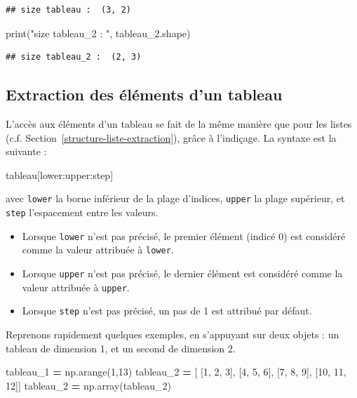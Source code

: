 \documentclass[12pt,]{book}
\newenvironment{Shaded}{\begin{snugshade}}{\end{snugshade}}
\newcommand{\DecValTok}[1]{\textcolor[rgb]{0.00,0.00,0.81}{#1}}
\newcommand{\StringTok}[1]{\textcolor[rgb]{0.31,0.60,0.02}{#1}}
\newcommand{\OperatorTok}[1]{\textcolor[rgb]{0.81,0.36,0.00}{\textbf{#1}}}
\newcommand{\BuiltInTok}[1]{#1}
\newcommand{\NormalTok}[1]{#1}
\providecommand{\tightlist}{%
  \setlength{\itemsep}{0pt}\setlength{\parskip}{0pt}}
\numberwithin{equation}{section}
\numberwithin{countremarque}{section}
\begin{document}
\begin{lstlisting}
## size tableau :  (3, 2)
\end{lstlisting}

\begin{Shaded}
\begin{Highlighting}[]
\BuiltInTok{print}\NormalTok{(}\StringTok{"size tableau_2 : "}\NormalTok{, tableau_2.shape)}
\end{Highlighting}
\end{Shaded}

\begin{lstlisting}
## size tableau_2 :  (2, 3)
\end{lstlisting}

\subsection{Extraction des éléments d'un
tableau}\label{extraction-des-elements-dun-tableau}

L'accès aux éléments d'un tableau se fait de la même manière que pour
les listes (c.f. Section~\ref{structure-liste-extraction}), grâce à
l'indiçage. La syntaxe est la suivante :

\begin{Shaded}
\begin{Highlighting}[]
\NormalTok{tableau[lower:upper:step]}
\end{Highlighting}
\end{Shaded}

avec \texttt{lower} la borne inférieur de la plage d'indices,
\texttt{upper} la plage supérieur, et \texttt{step} l'espacement entre
les valeurs.

\begin{itemize}
\tightlist
\item
  Lorsque \texttt{lower} n'est pas précisé, le premier élément (indicé
  0) est considéré comme la valeur attribuée à \texttt{lower}.
\item
  Lorsque \texttt{upper} n'est pas précisé, le dernier élément est
  considéré comme la valeur attribuée à \texttt{upper}.
\item
  Lorsque \texttt{step} n'est pas précisé, un pas de 1 est attribué par
  défaut.
\end{itemize}

Reprenons rapidement quelques exemples, en s'appuyant sur deux objets :
un tableau de dimension 1, et un second de dimension 2.

\begin{Shaded}
\begin{Highlighting}[]
\NormalTok{tableau_1 }\OperatorTok{=}\NormalTok{ np.arange(}\DecValTok{1}\NormalTok{,}\DecValTok{13}\NormalTok{)}
\NormalTok{tableau_2 }\OperatorTok{=}\NormalTok{ [ [}\DecValTok{1}\NormalTok{, }\DecValTok{2}\NormalTok{, }\DecValTok{3}\NormalTok{], [}\DecValTok{4}\NormalTok{, }\DecValTok{5}\NormalTok{, }\DecValTok{6}\NormalTok{], [}\DecValTok{7}\NormalTok{, }\DecValTok{8}\NormalTok{, }\DecValTok{9}\NormalTok{], [}\DecValTok{10}\NormalTok{, }\DecValTok{11}\NormalTok{, }\DecValTok{12}\NormalTok{]]}
\NormalTok{tableau_2 }\OperatorTok{=}\NormalTok{ np.array(tableau_2)}
\end{Highlighting}
\end{Shaded}
\end{document}
